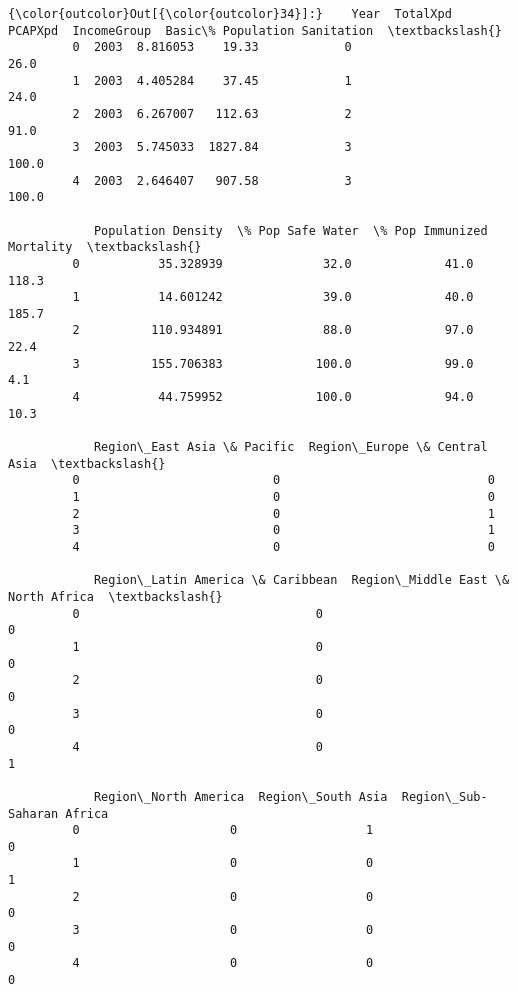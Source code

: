 \documentclass[11pt]{article}
\begin{document}
\begin{Verbatim}[commandchars=\\\{\}]
{\color{outcolor}Out[{\color{outcolor}34}]:}    Year  TotalXpd  PCAPXpd  IncomeGroup  Basic\% Population Sanitation  \textbackslash{}
         0  2003  8.816053    19.33            0                          26.0   
         1  2003  4.405284    37.45            1                          24.0   
         2  2003  6.267007   112.63            2                          91.0   
         3  2003  5.745033  1827.84            3                         100.0   
         4  2003  2.646407   907.58            3                         100.0   
         
            Population Density  \% Pop Safe Water  \% Pop Immunized  Mortality  \textbackslash{}
         0           35.328939              32.0             41.0      118.3   
         1           14.601242              39.0             40.0      185.7   
         2          110.934891              88.0             97.0       22.4   
         3          155.706383             100.0             99.0        4.1   
         4           44.759952             100.0             94.0       10.3   
         
            Region\_East Asia \& Pacific  Region\_Europe \& Central Asia  \textbackslash{}
         0                           0                             0   
         1                           0                             0   
         2                           0                             1   
         3                           0                             1   
         4                           0                             0   
         
            Region\_Latin America \& Caribbean  Region\_Middle East \& North Africa  \textbackslash{}
         0                                 0                                  0   
         1                                 0                                  0   
         2                                 0                                  0   
         3                                 0                                  0   
         4                                 0                                  1   
         
            Region\_North America  Region\_South Asia  Region\_Sub-Saharan Africa  
         0                     0                  1                          0  
         1                     0                  0                          1  
         2                     0                  0                          0  
         3                     0                  0                          0  
         4                     0                  0                          0  
\end{Verbatim}
            
\end{document}
